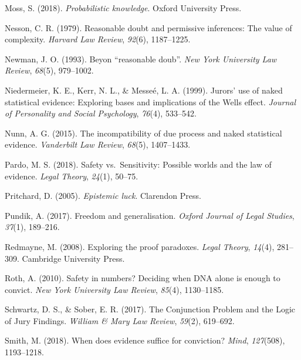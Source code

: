 \documentclass[10pt,dvipsnames,enabledeprecatedfontcommands]{scrartcl}
\begin{document}
\leavevmode\hypertarget{ref-moss2018}{}%
Moss, S. (2018). \emph{Probabilistic knowledge}. Oxford University
Press.

\leavevmode\hypertarget{ref-Nesson1979Reasonable-doub}{}%
Nesson, C. R. (1979). Reasonable doubt and permissive inferences: The
value of complexity. \emph{Harvard Law Review}, \emph{92}(6),
1187--1225.

\leavevmode\hypertarget{ref-newman1993}{}%
Newman, J. O. (1993). Beyon ``reasonable doub''. \emph{New York
University Law Review}, \emph{68}(5), 979--1002.

\leavevmode\hypertarget{ref-niedermeierEtAl1999}{}%
Niedermeier, K. E., Kerr, N. L., \& Messeé, L. A. (1999). Jurors' use of
naked statistical evidence: Exploring bases and implications of the
Wells effect. \emph{Journal of Personality and Social Psychology},
\emph{76}(4), 533--542.

\leavevmode\hypertarget{ref-nunn2015}{}%
Nunn, A. G. (2015). The incompatibility of due process and naked
statistical evidence. \emph{Vanderbilt Law Review}, \emph{68}(5),
1407--1433.

\leavevmode\hypertarget{ref-pardo2018}{}%
Pardo, M. S. (2018). Safety vs.~Sensitivity: Possible worlds and the law
of evidence. \emph{Legal Theory}, \emph{24}(1), 50--75.

\leavevmode\hypertarget{ref-pritchard2005epistemic}{}%
Pritchard, D. (2005). \emph{Epistemic luck}. Clarendon Press.

\leavevmode\hypertarget{ref-pundik2017}{}%
Pundik, A. (2017). Freedom and generalisation. \emph{Oxford Journal of
Legal Studies}, \emph{37}(1), 189--216.

\leavevmode\hypertarget{ref-redmayne2008exploring}{}%
Redmayne, M. (2008). Exploring the proof paradoxes. \emph{Legal Theory},
\emph{14}(4), 281--309. Cambridge University Press.

\leavevmode\hypertarget{ref-Roth2010}{}%
Roth, A. (2010). Safety in numbers? Deciding when DNA alone is enough to
convict. \emph{New York University Law Review}, \emph{85}(4),
1130--1185.

\leavevmode\hypertarget{ref-schwartz2017ConjunctionProblemLogic}{}%
Schwartz, D. S., \& Sober, E. R. (2017). The Conjunction Problem and the
Logic of Jury Findings. \emph{William \& Mary Law Review}, \emph{59}(2),
619--692.

\leavevmode\hypertarget{ref-smith2017}{}%
Smith, M. (2018). When does evidence suffice for conviction?
\emph{Mind}, \emph{127}(508), 1193--1218.
\end{document}
